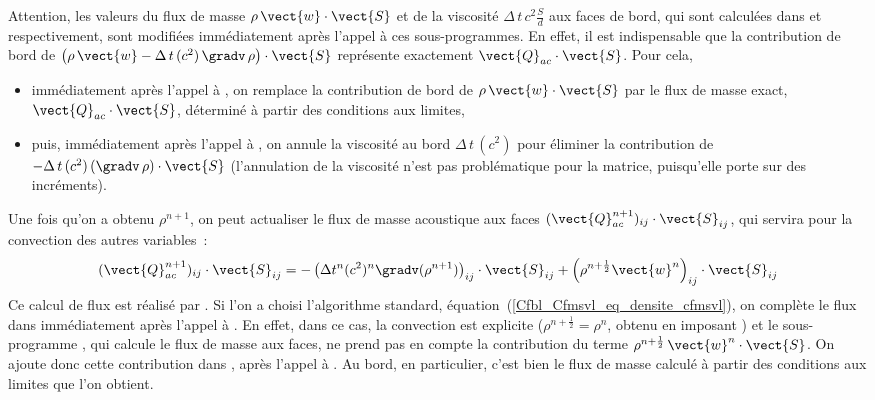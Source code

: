 Attention, les valeurs du flux de masse $\rho\,\vect{w}\cdot\vect{S}$ et
de la viscosit\'e $\Delta\,t\,c^2\frac{S}{d}$ aux faces de
bord, qui sont calcul\'ees dans  et  respectivement,
sont modifi\'ees imm\'ediatement apr\`es l'appel \`a ces sous-programmes.
En effet, il est indispensable que la contribution de bord de
$\left(\rho\,\vect{w}-\Delta\,t\,(c^2)\,\gradv\,\rho\right)\cdot\vect{S}$
repr\'esente exactement $\vect{Q}_{ac}\cdot\vect{S}$.
Pour cela,
\begin{itemize}
\item imm\'ediatement apr\`es l'appel \`a
, on remplace la contribution de bord de
$\rho\,\vect{w}\cdot\vect{S}$
par le flux de masse exact, $\vect{Q}_{ac}\cdot\vect{S}$,
d\'etermin\'e \`a partir des conditions aux limites,
\item puis, imm\'ediatement apr\`es l'appel \`a
, on annule la viscosit\'e au bord $\Delta\,t\,(c^2)$ pour
\'eliminer la contribution de $-\Delta\,t\,(c^2)\,(\gradv\,\rho)\cdot\vect{S}$
(l'annulation de la viscosit\'e n'est pas probl\'ematique pour la matrice,
puisqu'elle porte sur des incr\'ements).
\end{itemize}

\bigskip

Une fois qu'on a obtenu $\rho^{n+1}$,
on peut actualiser le flux de masse acoustique
aux faces $(\vect{Q}_{ac}^{n+1})_{ij} \cdot \vect{S}_{ij}$,
qui servira pour la convection des autres variables~:
\begin{equation}\label{Cfbl_Cfmsvl_eq_flux_masse_acoustique_cfmsvl}
\displaystyle(\vect{Q}_{ac}^{n+1})_{ij}\cdot\vect{S}_{ij}=
-\left(\Delta t^n (c^2)^n \gradv(\rho^{n+1})\right)_{ij}\cdot\vect{S}_{ij}
+\left(\rho^{n+\frac{1}{2}} \vect{w}^n\right)_{ij}\cdot\vect{S}_{ij}\\
\end{equation}
Ce calcul de flux est r\'ealis\'e par .
Si l'on a choisi l'algorithme standard, \'equation~(\ref{Cfbl_Cfmsvl_eq_densite_cfmsvl}),
on compl\`ete le flux dans  imm\'ediatement apr\`es l'appel
\`a .
En effet, dans ce cas,
la convection est explicite ($\rho^{n+\frac{1}{2}}=\rho^{n}$,
obtenu en imposant )
et le sous-programme ,
qui calcule le flux de masse aux faces,
ne prend pas en compte la contribution du terme
$\rho^{n+\frac{1}{2}}\,\vect{w}^n\cdot\vect{S}$. On ajoute donc cette
contribution dans , apr\`es l'appel \`a .
Au bord, en particulier, c'est bien le flux de masse calcul\'e \`a partir
des conditions aux limites que l'on obtient.

